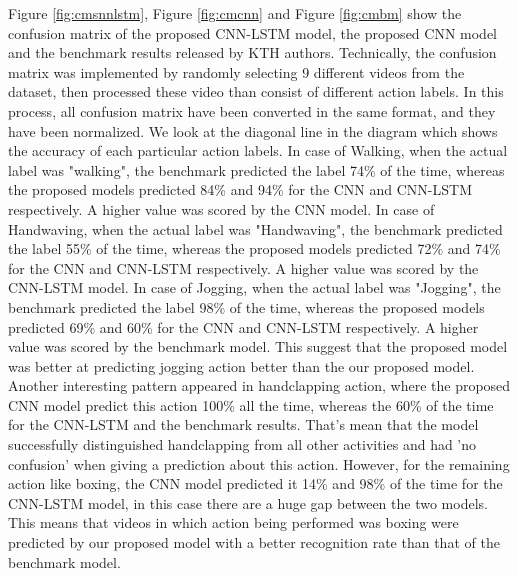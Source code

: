 Figure \ref{fig:cmsnnlstm}, Figure \ref{fig:cmcnn} and Figure \ref{fig:cmbm} show the confusion matrix of the proposed CNN-LSTM model, the proposed CNN model and the benchmark results released by KTH authors. Technically, the confusion matrix was implemented by randomly selecting 9 different videos from the dataset, then processed these video than consist of different action labels. In this process, all confusion matrix have been converted in the same format, and they have been normalized. We look at the diagonal line in the diagram which shows the accuracy of each particular action labels. In case of Walking, when the actual label was "walking", the benchmark predicted the label 74\% of the time, whereas the proposed models predicted 84\% and 94\% for the CNN and CNN-LSTM respectively. A higher value was scored by the CNN model. In case of Handwaving, when the actual label was "Handwaving", the benchmark predicted the label 55\% of the time, whereas the proposed models predicted 72\% and 74\% for the CNN and CNN-LSTM respectively. A higher value was scored by the CNN-LSTM model. In case of Jogging, when the actual label was "Jogging", the benchmark predicted the label 98\% of the time, whereas the proposed models predicted 69\% and 60\% for the CNN and CNN-LSTM respectively. A higher value was scored by the benchmark model. This suggest that the proposed model was better at predicting jogging action better than the our proposed model. Another interesting pattern appeared in handclapping action, where the proposed CNN model predict this action 100\% all the time, whereas the 60\% of the time for the CNN-LSTM and the benchmark results. That's mean that the model successfully distinguished handclapping from all other activities and had 'no confusion' when giving a prediction about this action. However, for the remaining action like boxing, the CNN model predicted it 14\% and 98\% of the time for the CNN-LSTM model, in this case there are a huge gap between the two models. This means that videos in which action being performed was boxing were predicted by our proposed model with a better recognition rate than that of the benchmark model.\\

